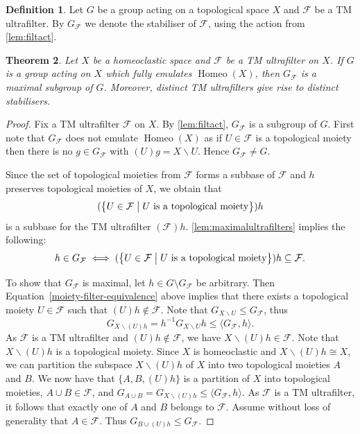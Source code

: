 \documentclass[11pt]{amsart}
\makeatletter
\newtheorem{theorem}{Theorem}[section]
\theoremstyle{definition}
\newtheorem{definition}[theorem]{Definition}
\newcommand{\filter}{\mathcal{F}}
\newcommand{\Homeo}{\operatorname{Homeo}}
\newcommand{\F}{\mathcal F}
\newcommand{\makeset}[2]{\left\lbrace #1 \;\middle|\;
 \begin{tabular}{@{}l@{}}
   #2
  \end{tabular}
  \right\rbrace}
\makeatother
\begin{document}
\begin{definition}
Let $G$ be a group acting on a topological space \(X\) and $\F$ be a TM ultrafilter. By $G_\F$ we denote the stabiliser of \(\filter\), using the action from \cref{lem:filtact}.   
\end{definition}

\begin{theorem}\label{theorem-stabilisers-clopen-maximal}
    Let $X$ be a homeoclastic space and $\filter$ be a TM ultrafilter on $X$. If \(G\) is a group acting on \(X\) which fully emulates \(\Homeo(X)\), 
    then  $G_{\filter}$ is a maximal subgroup of $G$. 
    Moreover, distinct TM ultrafilters give rise to distinct stabilisers. 
\end{theorem}
\begin{proof}
 Fix a TM ultrafilter $\filter$ on $X$. By \cref{lem:filtact}, $G_\F$ is a subgroup of $G$.
First note that \(G_\filter\) does not emulate \(\Homeo(X)\) as if \(U\in \filter\) is a topological moiety then there is no \(g\in G_\filter\) with \((U)g=X\backslash U\). Hence \(G_\filter \neq G\). 

Since the set of topological moieties from $\F$ forms a subbase of $\F$ and $h$ preserves topological moieties of $X$, we obtain that \[(\makeset{U\in \mathcal{F}}{\(U\) is a topological moiety})h\] is a subbase for the TM ultrafilter \((\mathcal{F})h\). 
 \cref{lem:maximalultrafilters} implies the following:
\begin{equation}\label{moiety-filter-equivalence}
h\in G_{\filter} \iff (\makeset{U\in \mathcal{F}}{\(U\) is a topological moiety})h \subseteq \mathcal{F}.   
\end{equation}

To show that $G_{\filter}$ is maximal, let $h\in G\setminus G_{\filter}$ be arbitrary.
Then Equation~\ref{moiety-filter-equivalence} above implies that there exists a topological moiety $U\in \filter$ such that $(U)h\not \in \filter$. Note that \(G_{X\backslash U}\leq G_\filter\), thus \[G_{X\backslash (U)h}=h^{-1}G_{X\backslash U}h \leq 
 \langle G_\filter ,h\rangle.\] 
 As \(\filter\) is a TM ultrafilter and $(U)h\not \in \filter$, we have \(X\backslash (U)h\in\F\). Note that \(X\backslash (U)h\) is a topological moiety. Since $X$ is homeoclastic and \(X\backslash (U)h\cong X\), we can partition the subspace \(X\backslash (U)h\) of \(X\) into two topological moieties \(A\) and \(B\).
 We now have that \(\{A,B,(U)h\}\) is a partition of \(X\) into topological moieties, \(A\cup B \in \F\), and \(G_{A\cup B}=G_{X\backslash (U)h}\leq 
 \langle G_\filter ,h\rangle.\) As \(\F\) is a TM ultrafilter, it follows that exactly one of \(A\) and \(B\) belongs to \(\F\). Assume without loss of generality that \(A\in \F\). Thus \(G_{B\cup (U)h} \leq G_{\F}\).
 

\end{proof}
\end{document}
